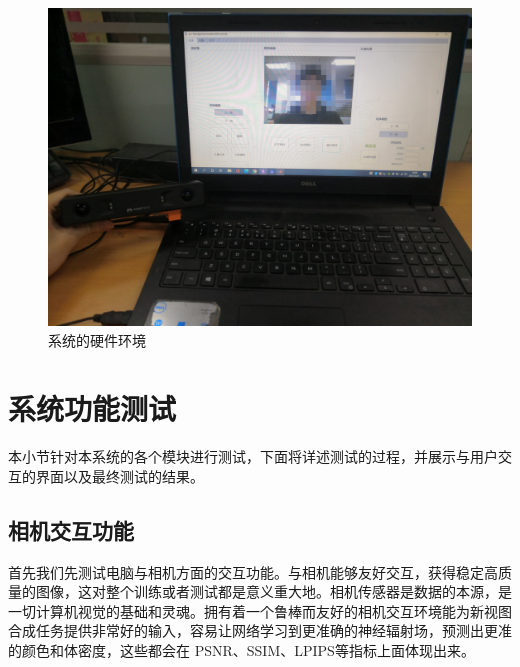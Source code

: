 \begin{figure}[htbp]
	\centering
	\includegraphics[width=0.95\linewidth]{figures/system-hardware.jpg}
	\caption{系统的硬件环境}
	\label{fig:photo}
\end{figure}
\pagebreak
\section{系统功能测试}
本小节针对本系统的各个模块进行测试，下面将详述测试的过程，并展示与用户交互的界面以及最终测试的结果。
\subsection{相机交互功能}
首先我们先测试电脑与相机方面的交互功能。与相机能够友好交互，获得稳定高质量的图像，这对整个训练或者测试都是意义重大地。相机传感器是数据的本源，是一切计算机视觉的基础和灵魂。拥有着一个鲁棒而友好的相机交互环境能为新视图合成任务提供非常好的输入，容易让网络学习到更准确的神经辐射场，预测出更准的颜色和体密度，这些都会在 PSNR、SSIM、LPIPS等指标上面体现出来。

